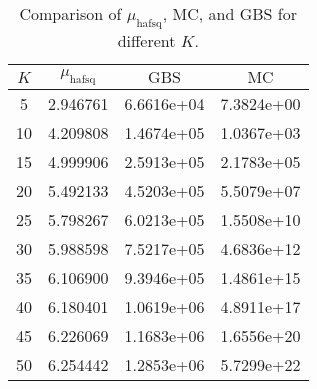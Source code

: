 \begin{table}[h!]
    \centering
    \begin{tabular}{|c|c|c|c|}
    \hline
    $K$ & $\mu_{\text{hafsq}}$ & $\text{GBS}$ & $\text{MC}$ \\ 
    \hline
5&2.946761 & 6.6616e+04 & 7.3824e+00 \\
10&4.209808 & 1.4674e+05 & 1.0367e+03 \\
15&4.999906 & 2.5913e+05 & 2.1783e+05 \\
20&5.492133 & 4.5203e+05 & 5.5079e+07 \\
25&5.798267 & 6.0213e+05 & 1.5508e+10 \\
30&5.988598 & 7.5217e+05 & 4.6836e+12 \\
35&6.106900 & 9.3946e+05 & 1.4861e+15 \\
40&6.180401 & 1.0619e+06 & 4.8911e+17 \\
45&6.226069 & 1.1683e+06 & 1.6556e+20 \\
50&6.254442 & 1.2853e+06 & 5.7299e+22 \\
\hline
    \end{tabular}
    \caption{Comparison of $\mu_{\text{hafsq}}$, MC, and GBS for different $K$.}
    \label{tab:comparison}
    \end{table}